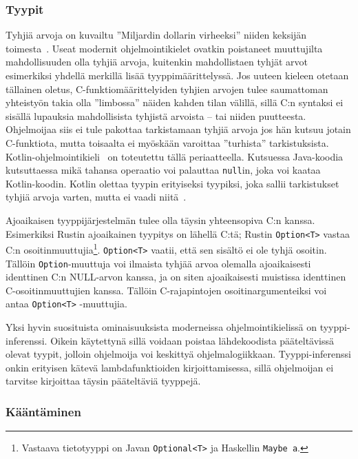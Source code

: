 \subsubsection{Tyypit}

Tyhjiä arvoja on kuvailtu ''Miljardin dollarin virheeksi'' niiden keksijän
toimesta~\citep{billiondollars}. Useat modernit ohjelmointikielet ovatkin
poistaneet muuttujilta mahdollisuuden olla tyhjiä arvoja, kuitenkin
mahdollistaen tyhjät arvot esimerkiksi yhdellä merkillä lisää
tyyppimäärittelyssä. Jos uuteen kieleen otetaan tällainen oletus,
C-funktiomäärittelyiden tyhjien arvojen tulee saumattoman yhteistyön takia olla
''limbossa'' näiden kahden tilan välillä, sillä C:n syntaksi ei sisällä
lupauksia mahdollisista tyhjistä arvoista -- tai niiden puutteesta. Ohjelmoijaa
siis ei tule pakottaa tarkistamaan tyhjiä arvoja jos hän kutsuu jotain
C-funktiota, mutta toisaalta ei myöskään varoittaa ''turhista'' tarkistuksista.
Kotlin-ohjelmointikieli~\citep{kotlin} on toteutettu tällä periaatteella.
Kutsuessa Java-koodia kutsuttaessa mikä tahansa operaatio voi palauttaa
\texttt{null}in, joka voi kaataa Kotlin-koodin. Kotlin olettaa tyypin
erityiseksi tyypiksi, joka sallii tarkistukset tyhjiä arvoja varten, mutta ei
vaadi niitä~\citep{kotlinnullability}.

Ajoaikaisen tyyppijärjestelmän tulee olla täysin yhteensopiva C:n kanssa.
Esimerkiksi Rustin ajoaikainen tyypitys on lähellä C:tä; Rustin
\texttt{Option<T>} vastaa C:n osoitinmuuttujia\footnote{Vastaava tietotyyppi on
Javan \texttt{Optional<T>} ja Haskellin \texttt{Maybe a}.}. \texttt{Option<T>}
vaatii, että sen sisältö ei ole tyhjä osoitin. Tällöin \texttt{Option}-muuttuja voi ilmaista tyhjää
arvoa olemalla ajoaikaisesti identtinen C:n NULL-arvon kanssa, ja on siten
ajoaikaisesti muistissa identtinen C-osoitinmuuttujien kanssa. Tällöin
C-rajapintojen osoitinargumenteiksi voi antaa \texttt{Option<T>} -muuttujia.

Yksi hyvin suosituista ominaisuuksista moderneissa ohjelmointikielissä on
tyyppi-inferenssi. Oikein käytettynä sillä voidaan poistaa lähdekoodista
pääteltävissä olevat tyypit, jolloin ohjelmoija voi keskittyä ohjelmalogiikkaan.
Tyyppi-inferenssi onkin erityisen kätevä lambdafunktioiden kirjoittamisessa,
sillä ohjelmoijan ei tarvitse kirjoittaa täysin pääteltäviä tyyppejä.

\subsubsection{Kääntäminen}

